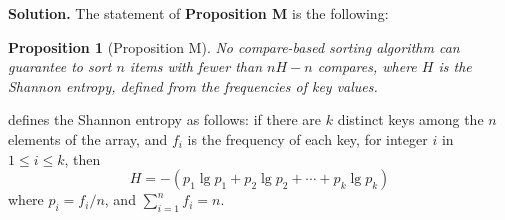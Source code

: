 \documentclass[12pt, a4paper]{article}
\newtheorem*{proposition}{Proposition}
\newenvironment{sol}[1][Solution]
{\par\medskip\noindent \textbf{#1.} }
{\medskip}
\begin{document}
	\begin{sol}
		The statement of \textbf{Proposition M} is the following:
		\begin{tcolorbox}[breakable]
			\begin{proposition}[Proposition M]
				No compare-based sorting algorithm can guarantee to sort $n$ items with fewer
				than $nH-n$ compares, where $H$ is the Shannon entropy, defined from the frequencies
				of key values.
			\end{proposition}
		\end{tcolorbox}
		\cite{sedgewick_wayne} defines the Shannon entropy as follows: if there are $k$ distinct
		keys among the $n$ elements of the array, and $f_i$ is the frequency of each key, for
		integer $i$ in $1\leq i\leq k$, then
		\[
		H=-(p_1\lg p_1+p_2\lg p_2+\cdots+p_k\lg p_k)
		\]
		where $p_i=f_i/n$, and $\sum_{i=1}^{n}f_i=n$.
		

\end{sol}
\end{document}
